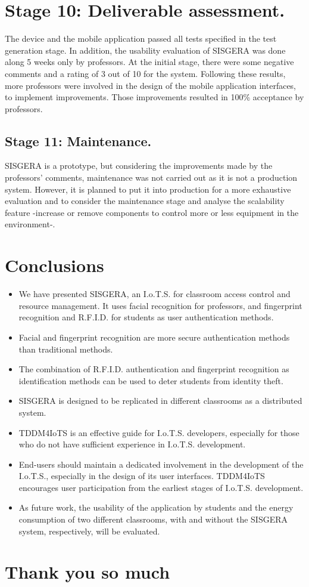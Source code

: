 \documentclass[]{scrartcl}
\begin{document}
\section*{Stage 10: Deliverable assessment.}
	The device and the mobile application passed all tests specified in the test generation stage. In addition, the usability evaluation of SISGERA was done along 5 weeks only by professors. At the initial stage, there were some negative comments and a rating of 3 out of 10 for the system. Following these results, more professors were involved in the design of the mobile application interfaces, to implement improvements. Those improvements resulted in 100\% acceptance by professors.
	
	\subsection*{Stage 11: Maintenance.}
	SISGERA is a prototype, but considering the improvements made by the professors' comments, maintenance was not carried out as it is not a production system. However, it is planned to put it into production for a more exhaustive evaluation and to consider the maintenance stage and analyse the scalability feature -increase or remove components to control more or less equipment in the environment-.

\section*{Conclusions}
	\begin{itemize}
		\item We have presented SISGERA, an I.o.T.S. for classroom access control and resource management. It uses facial recognition for professors, and fingerprint recognition and R.F.I.D. for students as user authentication methods.
		\item Facial and fingerprint recognition are more secure authentication methods than traditional methods.
		\item The combination of R.F.I.D. authentication and fingerprint recognition as identification methods can be used to deter students from identity theft.
		\item SISGERA is designed to be replicated in different classrooms as a distributed system.
		\item TDDM4IoTS is an effective guide for I.o.T.S. developers, especially for those who do not have sufficient experience in I.o.T.S. development.
		\item End-users should maintain a dedicated involvement in the development of the I.o.T.S., especially in the design of its user interfaces.
		TDDM4IoTS encourages user participation from the earliest stages of I.o.T.S. development.
		\item As future work, the usability of the application by students and the energy consumption of two different classrooms, with and without the SISGERA system, respectively, will be evaluated.
	\end{itemize}

\section*{Thank you so much}
\end{document}
